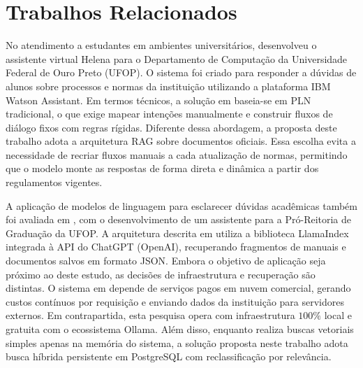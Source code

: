\documentclass[12pt]{article}
\begin{document}
\section{Trabalhos Relacionados}\label{sec:trabalhos-relacionados}
No atendimento a estudantes em ambientes universitários, \cite{monteiro2021helena} desenvolveu o assistente virtual Helena para o Departamento de Computação da Universidade Federal de Ouro Preto (UFOP). O sistema foi criado para responder a dúvidas de alunos sobre processos e normas da instituição utilizando a plataforma IBM Watson Assistant. Em termos técnicos, a solução em \cite{monteiro2021helena} baseia-se em PLN tradicional, o que exige mapear intenções manualmente e construir fluxos de diálogo fixos com regras rígidas. Diferente dessa abordagem, a proposta deste trabalho adota a arquitetura RAG sobre documentos oficiais. Essa escolha evita a necessidade de recriar fluxos manuais a cada atualização de normas, permitindo que o modelo monte as respostas de forma direta e dinâmica a partir dos regulamentos vigentes.

A aplicação de modelos de linguagem para esclarecer dúvidas acadêmicas também foi avaliada em \cite{barbosa2023chatbot}, com o desenvolvimento de um assistente para a Pró-Reitoria de Graduação da UFOP. A arquitetura descrita em \cite{barbosa2023chatbot} utiliza a biblioteca LlamaIndex integrada à API do ChatGPT (OpenAI), recuperando fragmentos de manuais e documentos salvos em formato JSON. Embora o objetivo de aplicação seja próximo ao deste estudo, as decisões de infraestrutura e recuperação são distintas. O sistema em \cite{barbosa2023chatbot} depende de serviços pagos em nuvem comercial, gerando custos contínuos por requisição e enviando dados da instituição para servidores externos. Em contrapartida, esta pesquisa opera com infraestrutura $100\%$ local e gratuita com o ecossistema Ollama. Além disso, enquanto \cite{barbosa2023chatbot} realiza buscas vetoriais simples apenas na memória do sistema, a solução proposta neste trabalho adota busca híbrida persistente em PostgreSQL com reclassificação por relevância.
\end{document}
